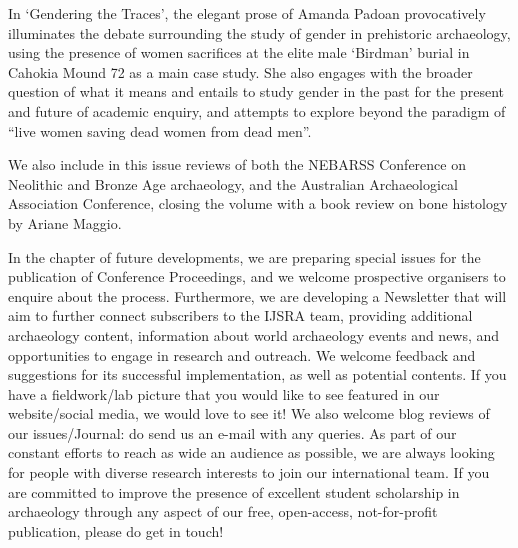 In ‘Gendering the Traces’, the elegant prose of Amanda Padoan provocatively illuminates the debate surrounding the study of gender in prehistoric archaeology, using the presence of women sacrifices at the elite male ‘Birdman’ burial in Cahokia Mound 72 as a main case study. She also engages with the broader question of what it means and entails to study gender in the past for the present and future of academic enquiry, and attempts to explore beyond the paradigm of “live women saving dead women from dead men”.

We also include in this issue reviews of both the NEBARSS Conference on Neolithic and Bronze Age archaeology, and the Australian Archaeological Association Conference, closing the volume with a book review on bone histology by Ariane Maggio.

In the chapter of future developments, we are preparing special issues for the publication of Conference Proceedings, and we welcome prospective organisers to enquire about the process. Furthermore, we are developing a Newsletter that will aim to further connect subscribers to the IJSRA team, providing additional archaeology content, information about world archaeology events and news, and opportunities to engage in research and outreach. We welcome feedback and suggestions for its successful implementation, as well as potential contents. If you have a fieldwork/lab picture that you would like to see featured in our website/social media, we would love to see it! We also welcome blog reviews of our issues/Journal: do send us an e-mail with any queries.
As part of our constant efforts to reach as wide an audience as possible, we are always looking for people with diverse research interests to join our international team. If you are committed to improve the presence of excellent student scholarship in archaeology through any aspect of our free, open-access, not-for-profit publication, please do get in touch!

\IJSRAclosing%